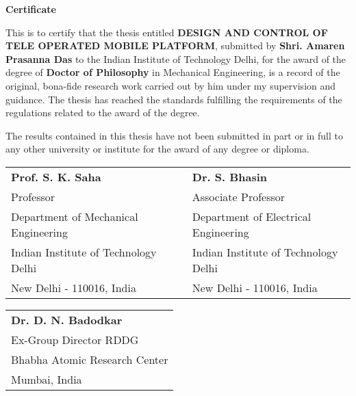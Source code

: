 \doublespacing
\newpage
\thispagestyle{empty}
\mbox{}
\newpage
\thispagestyle{empty}
\begin{center}
\textbf{\Large{Certificate}}
\end{center}

This is to certify that the thesis entitled \textbf{DESIGN AND CONTROL OF TELE OPERATED MOBILE PLATFORM}, submitted by   \textbf{Shri. Amaren Prasanna Das} to the Indian Institute of Technology Delhi, for the award of the degree of \textbf{Doctor of Philosophy} in Mechanical Engineering, is a record of the original, bona-fide research work carried out by him under my supervision and guidance. The thesis has reached the standards fulfilling the requirements of the regulations related to the award of the degree.

The results contained in this thesis have not been submitted in part or in full to any other university or institute for the award of any degree or diploma.
\bigskip
\bigskip
\bigskip
\bigskip
\bigskip

\begin{tabular}{l l l}
\textbf{Prof. S. K. Saha} &  & \textbf{Dr. S. Bhasin}\\
Professor & &Associate Professor\\
Department of Mechanical Engineering &  & Department of Electrical Engineering\\
Indian Institute of Technology Delhi &  & Indian Institute of Technology Delhi\\
New Delhi - 110016, India & \quad \quad \quad & New Delhi - 110016, India
\end{tabular}
\bigskip
\bigskip
\bigskip
\bigskip
\bigskip

\begin{tabular}{l}
\textbf{Dr. D. N. Badodkar}\\
Ex-Group Director RDDG\\
Bhabha Atomic Research Center\\
Mumbai, India\\
\end{tabular}












\restoregeometry